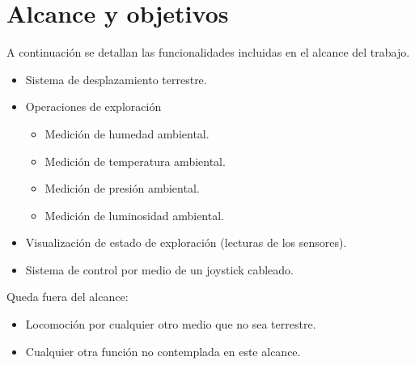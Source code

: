 
\section{Alcance y objetivos}
A continuación se detallan las funcionalidades incluidas en el alcance del trabajo.

\begin{itemize}
	\item Sistema de desplazamiento terrestre.
	\item Operaciones de exploración
	\begin{itemize}	
		 \item Medición de humedad ambiental.
		 \item Medición de temperatura ambiental.
		 \item Medición de presión ambiental.
		 \item Medición de luminosidad ambiental.
	\end{itemize}

	\item Visualización de estado de exploración (lecturas de los sensores).
	\item Sistema de control por medio de un joystick cableado.
\end{itemize}

Queda fuera del alcance:
\begin{itemize}
	\item Locomoción por cualquier otro medio que no sea terrestre.
	\item Cualquier otra función no contemplada en este alcance.
\end{itemize}




